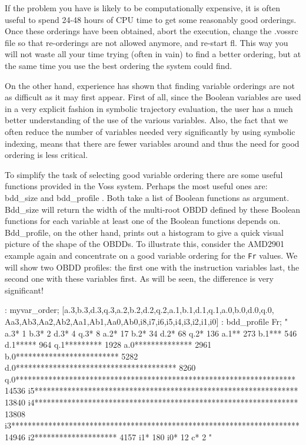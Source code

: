 If the problem you have is likely to be computationally expensive,
it is often useful to spend 24-48 hours of CPU time
to get some reasonably good orderings.
Once these orderings have been obtained, 
abort the execution, change the .vossrc file
so that re-orderings are not allowed anymore, and re-start fl.
This way you will not waste all your time trying (often in vain)
to find a better ordering, but at the same time you use the best ordering
the system could find.

On the other hand, experience has shown that finding variable orderings%
%
{}
are not as difficult as it may first appear.
First of all, since the Boolean variables are used in a very
explicit fashion in symbolic trajectory evaluation, the user has a
much better understanding of the use of the various variables.
Also,  the fact that we often reduce the number of variables needed
very significantly by using symbolic indexing, means that there
are fewer variables around and thus the need for good ordering
is less critical.

To simplify the task of selecting good variable ordering there are
some useful functions provided in the Voss system.
Perhaps the most useful ones are: bdd\_size%
%
{} and bdd\_profile%
%
{}.
Both take a list of Boolean functions as argument.
Bdd\_size will return the width of the multi-root OBDD defined by
these Boolean functions for each variable at least one of the Boolean
functions depends on.
Bdd\_profile, on the other hand, prints out a histogram%
%
{} to give a quick
visual picture of the shape of the OBDDs.
To illustrate this, consider the AMD2901 example again and
concentrate on a good variable ordering for the {\tt Fr} values.
We will show two OBDD profiles: the first one with the instruction
variables last, the second one with these variables first.
As will be seen, the difference is very significant!
\begin{hol}
: myvar\_order;
[a.3,b.3,d.3,q.3,a.2,b.2,d.2,q.2,a.1,b.1,d.1,q.1,a.0,b.0,d.0,q.0,
 Aa3,Ab3,Aa2,Ab2,Aa1,Ab1,Aa0,Ab0,i8,i7,i6,i5,i4,i3,i2,i1,i0]
: bdd\_profile Fr;
"
a.3* 1
b.3* 2
d.3* 4
q.3* 8
a.2* 17
b.2* 34
d.2* 68
q.2* 136
a.1** 273
b.1*** 546
d.1***** 964
q.1********* 1928
a.0************** 2961
b.0************************* 5282
d.0*************************************** 8260
q.0******************************************************************** 14536
 i5**************************************************************** 13840
 i4**************************************************************** 13808
 i3********************************************************************** 14946
 i2******************** 4157
 i1* 180
 i0* 12
  c* 2
"
\end{hol}

